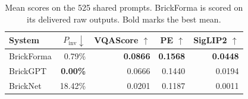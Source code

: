 \begin{table}[t]
\centering\small
\setlength{\tabcolsep}{3pt}
\begin{tabular}{lrrrr}
\toprule
System & $P_{\mathrm{inv}}\downarrow$ & VQAScore $\uparrow$ & PE $\uparrow$ & SigLIP2 $\uparrow$ \\
\midrule
BrickForma & 0.79\% & \textbf{0.0866} & \textbf{0.1568} & \textbf{0.0448} \\
BrickGPT & \textbf{0.00\%} & 0.0666 & 0.1440 & 0.0194 \\
BrickNet & 18.42\% & 0.0201 & 0.1187 & 0.0011 \\
\bottomrule
\end{tabular}
\caption{Mean scores on the 525 shared prompts. BrickForma is scored on its delivered raw outputs. Bold marks the best mean.}
\label{tab:main}
\end{table}
